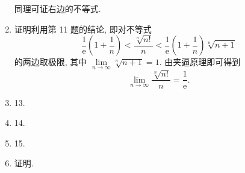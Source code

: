 \documentclass[12pt, a4paper]{article}
\begin{document}
\begin{enumerate}
        同理可证右边的不等式.
    \item {\heiti 证明}\quad 利用第 11 题的结论, 即对不等式
        \[
            \frac{1}{\mathrm{e}}\left(1 + \frac1n\right) < \frac{\sqrt[n]{n!}}{n} < \frac{1}{\mathrm{e}}\left(1 + \frac1n\right)\sqrt[n]{n+1}  
        \]
        的两边取极限, 其中 $\lim\limits_{n\to\infty}\sqrt[n]{n+1} = 1$. 由夹逼原理即可得到
        \[
            \lim\limits_{n\to\infty}\frac{\sqrt[n]{n!}}{n} = \frac{1}{\mathrm{e}}.    
        \]
    \item 13.
    \item 14.
    \item 15.
    \item {\heiti 证明}\quad.
\end{enumerate}
\end{document}
